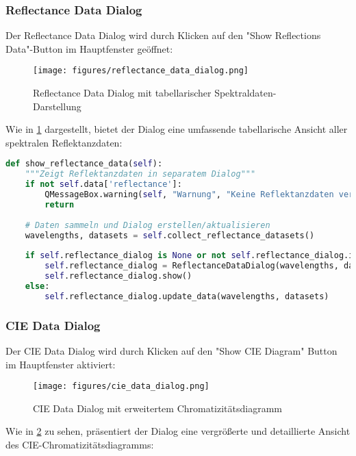 \subsubsection{Reflectance Data Dialog}

Der Reflectance Data Dialog wird durch Klicken auf den "Show Reflections Data"-Button im Hauptfenster geöffnet:

\begin{figure}[H]
    \centering
\texttt{[image: figures/reflectance\_data\_dialog.png]}
\caption{Reflectance Data Dialog mit tabellarischer Spektraldaten-Darstellung}
\label{fig:reflectance_data_dialog}
\end{figure}

Wie in \ref{fig:reflectance_data_dialog} dargestellt, bietet der Dialog eine umfassende tabellarische Ansicht aller spektralen Reflektanzdaten:

\begin{lstlisting}[language=Python, caption=Reflektanzdaten-Dialog]
def show_reflectance_data(self):
    """Zeigt Reflektanzdaten in separatem Dialog"""
    if not self.data['reflectance']:
        QMessageBox.warning(self, "Warnung", "Keine Reflektanzdaten verfuegbar.")
        return
    
    # Daten sammeln und Dialog erstellen/aktualisieren
    wavelengths, datasets = self.collect_reflectance_datasets()
    
    if self.reflectance_dialog is None or not self.reflectance_dialog.isVisible():
        self.reflectance_dialog = ReflectanceDataDialog(wavelengths, datasets, self)
        self.reflectance_dialog.show()
    else:
        self.reflectance_dialog.update_data(wavelengths, datasets)
\end{lstlisting}

\subsubsection{CIE Data Dialog}

Der CIE Data Dialog wird durch Klicken auf den "Show CIE Diagram" Button im Hauptfenster aktiviert:

\begin{figure}[H]
    \centering
\texttt{[image: figures/cie\_data\_dialog.png]}
\caption{CIE Data Dialog mit erweitertem Chromatizitätsdiagramm}
\label{fig:cie_data_dialog}
\end{figure}

Wie in \ref{fig:cie_data_dialog} zu sehen, präsentiert der Dialog eine vergrößerte und detaillierte Ansicht des CIE-Chromatizitätsdiagramms:

